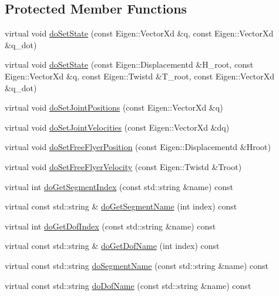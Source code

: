 \subsection*{Protected Member Functions}
\begin{DoxyCompactItemize}
\item 
virtual void \hyperlink{classocra__icub_1_1OcraWbiModel_a8639b19a514624953e5e58dbde1c8227}{do\+Set\+State} (const Eigen\+::\+Vector\+Xd \&q, const Eigen\+::\+Vector\+Xd \&q\+\_\+dot)
\item 
virtual void \hyperlink{classocra__icub_1_1OcraWbiModel_a411c844cbde565ed54a224e39a2e65c1}{do\+Set\+State} (const Eigen\+::\+Displacementd \&H\+\_\+root, const Eigen\+::\+Vector\+Xd \&q, const Eigen\+::\+Twistd \&T\+\_\+root, const Eigen\+::\+Vector\+Xd \&q\+\_\+dot)
\item 
virtual void \hyperlink{classocra__icub_1_1OcraWbiModel_a64d40044dff11a6302992d52f1dbde0d}{do\+Set\+Joint\+Positions} (const Eigen\+::\+Vector\+Xd \&q)
\item 
virtual void \hyperlink{classocra__icub_1_1OcraWbiModel_a26a758c5ecb02601c066bdfffe5db194}{do\+Set\+Joint\+Velocities} (const Eigen\+::\+Vector\+Xd \&dq)
\item 
virtual void \hyperlink{classocra__icub_1_1OcraWbiModel_aa2bb481dc7fdb55c363ac1a404a807e5}{do\+Set\+Free\+Flyer\+Position} (const Eigen\+::\+Displacementd \&Hroot)
\item 
virtual void \hyperlink{classocra__icub_1_1OcraWbiModel_af740a36f6cc2899dcd6f3507b9703c7f}{do\+Set\+Free\+Flyer\+Velocity} (const Eigen\+::\+Twistd \&Troot)
\item 
virtual int \hyperlink{classocra__icub_1_1OcraWbiModel_a2587c2c67336e33077d50dd0f5a9e36a}{do\+Get\+Segment\+Index} (const std\+::string \&name) const
\item 
virtual const std\+::string \& \hyperlink{classocra__icub_1_1OcraWbiModel_adaa942dfad4d88adec255f3eac59e443}{do\+Get\+Segment\+Name} (int index) const
\item 
virtual int \hyperlink{classocra__icub_1_1OcraWbiModel_a327862ec0da18711147d0ec62002fbef}{do\+Get\+Dof\+Index} (const std\+::string \&name) const
\item 
virtual const std\+::string \& \hyperlink{classocra__icub_1_1OcraWbiModel_a63909e361f9361a6b20be8c0121b6d3c}{do\+Get\+Dof\+Name} (int index) const
\item 
virtual const std\+::string \hyperlink{classocra__icub_1_1OcraWbiModel_ac32c3de3dd4eb7864e4e81df96785cb2}{do\+Segment\+Name} (const std\+::string \&name) const
\item 
virtual const std\+::string \hyperlink{classocra__icub_1_1OcraWbiModel_af65d4fd7cae0ed86ea2bb588a9e024f9}{do\+Dof\+Name} (const std\+::string \&name) const
\end{DoxyCompactItemize}
